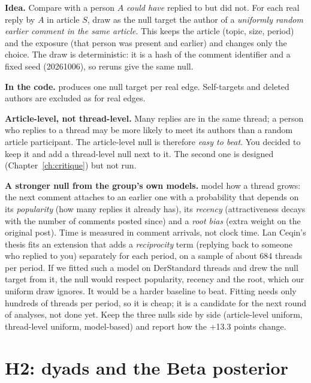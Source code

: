 \textbf{Idea.} Compare with a person $A$ \emph{could have} replied to but did not. For each real reply by $A$ in article $S$, draw as the null target the author of a \emph{uniformly random earlier comment in the same article}. This keeps the article (topic, size, period) and the exposure (that person was present and earlier) and changes only the choice. The draw is deterministic: it is a hash of the comment identifier and a fixed seed (20261006), so reruns give the same null.

\textbf{In the code.}  produces one null target per real edge. Self-targets and deleted authors are excluded as for real edges.

\begin{pitfall}
\textbf{Article-level, not thread-level.} Many replies are in the same thread; a person who replies to a thread may be more likely to meet its authors than a random article participant. The article-level null is therefore \emph{easy to beat}. You decided to keep it and add a thread-level null next to it. The second one is designed (Chapter~\ref{ch:critique}) but not run.
\end{pitfall}

\textbf{A stronger null from the group's own models.}  model how a thread grows: the next comment attaches to an earlier one with a probability that depends on its \emph{popularity} (how many replies it already has), its \emph{recency} (attractiveness decays with the number of comments posted since) and a \emph{root bias} (extra weight on the original post). Time is measured in comment arrivals, not clock time. Lan Ceqin's thesis fits an extension that adds a \emph{reciprocity} term (replying back to someone who replied to you) separately for each period, on a sample of about 684 threads per period. If we fitted such a model on DerStandard threads and drew the null target from it, the null would respect popularity, recency and the root, which our uniform draw ignores. It would be a harder baseline to beat. Fitting needs only hundreds of threads per period, so it is cheap; it is a candidate for the next round of analyses, not done yet. Keep the three nulls side by side (article-level uniform, thread-level uniform, model-based) and report how the +13.3 points change.

\section{H2: dyads and the Beta posterior}\label{sec:h2}

